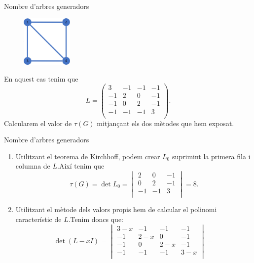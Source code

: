 \documentclass{beamer}
\begin{document}
\begin{frame}{Nombre d'arbres generadors}
    \begin{exampleblock}{}
        \begin{figure}
            \centering
            \includegraphics[width=2.5cm]{Imatges/graf1.jpg}
        \end{figure}
        En aquest cas tenim que $$L=\begin{pmatrix}
                3  & -1 & -1 & -1 \\
                -1 & 2  & 0  & -1 \\
                -1 & 0  & 2  & -1 \\
                -1 & -1 & -1 & 3  \\
            \end{pmatrix}.$$\pause
        Calcularem el valor de $\tau(G)$ mitjançant els dos mètodes que hem exposat.
    \end{exampleblock}
\end{frame}
\begin{frame}{Nombre d'arbres generadors}
    \begin{exampleblock}{}
        \begin{enumerate}
            \item Utilitzant el teorema de Kirchhoff, podem crear $L_0$ suprimint la primera fila i columna de $L$.\pause\space Així tenim que $$\tau(G)=\det L_0=\begin{vmatrix}
                          2  & 0  & -1 \\
                          0  & 2  & -1 \\
                          -1 & -1 & 3  \\
                      \end{vmatrix}=8.$$\pause
            \item Utilitzant el mètode dels valors propis hem de calcular el polinomi característic de $L$.\pause\space Tenim doncs que:
                  $$\det(L-xI)=\begin{vmatrix}
                          3-x & -1  & -1  & -1  \\
                          -1  & 2-x & 0   & -1  \\
                          -1  & 0   & 2-x & -1  \\
                          -1  & -1  & -1  & 3-x \\
                      \end{vmatrix}=$$
        \end{enumerate}
    \end{exampleblock}
\end{frame}
\end{document}
